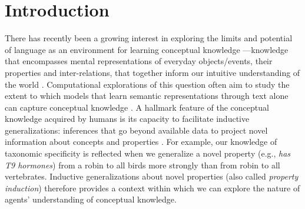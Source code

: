 \documentclass[10pt,letterpaper]{article}
\begin{document}
\section{Introduction}
There has recently been a growing interest in exploring the limits and potential of language as an environment for learning conceptual knowledge \citep{elman2004alternative, lupyan2019words}---knowledge that encompasses mental representations of everyday objects/events, their properties and inter-relations, that together inform our intuitive understanding of the world \citep{murphy2004big, machery2009doing}.
Computational explorations of this question often aim to study the extent to which models that learn semantic representations through text alone can capture conceptual knowledge \citep{lucy-gauthier-2017-distributional, forbes2019neural, bhatia2020transformer}.
A hallmark feature of the conceptual knowledge acquired by humans is its capacity to facilitate inductive generalizations: inferences that go beyond available data to project novel information about concepts and properties \citep{osherson1990category, chater2011inductive, hayes2018inductive}.
For example, our knowledge of taxonomic specificity is reflected when we generalize a novel property (e.g., \textit{has T9 hormones}) from a robin to all birds more strongly than from robin to all vertebrates.
Inductive generalizations about novel properties (also called \textit{property induction}) therefore provides a context within which we can explore the nature of 
agents' understanding of conceptual knowledge.
\end{document}
